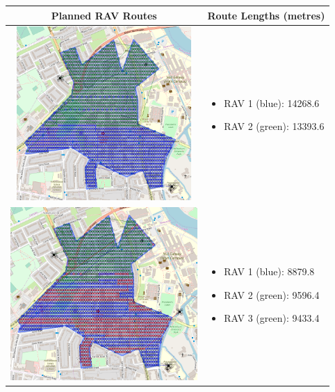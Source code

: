 \begin{table}[h!]
  \centering
  \begin{tabular}{ | c | m{5cm} | }
    \hline
    Planned RAV Routes & Route Lengths (metres) \\
    \hline
    
    \begin{minipage}[c][68mm][c]{.6\textwidth}
      \includegraphics[width=\linewidth, height=66mm]{Chapters/MultiAgentCoverage/MultipleTravellingSalesman/Figs/IrregularRegion/TwoRAV.PNG}
    \end{minipage}
    &
    \begin{itemize}[leftmargin=*]
       \item[] RAV 1 (blue): 14268.6
        \item[] RAV 2 (green): 13393.6
    \end{itemize}
    \\
    \hline
    \begin{minipage}[c][68mm][c]{.6\textwidth}
      \includegraphics[width=\linewidth, height=66mm]{Chapters/MultiAgentCoverage/MultipleTravellingSalesman/Figs/IrregularRegion/ThreeRAV.PNG}
    \end{minipage}
    &
    \begin{itemize}[leftmargin=*]
        \item[] RAV 1 (blue): 8879.8
        \item[] RAV 2 (green): 9596.4
        \item[] RAV 3 (green): 9433.4
    \end{itemize}
    \\
    \hline
    

\end{tabular}
\end{table}
